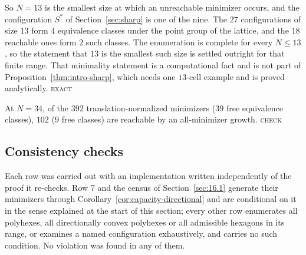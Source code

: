 \documentclass[11pt]{article}
\theoremstyle{plain}
\theoremstyle{definition}
\theoremstyle{remark}
\begin{document}
So \(N=13\) is the smallest size at which an unreachable minimizer occurs, and the
configuration \(S^{*}\) of Section~\ref{sec:sharp} is one of the nine. The \(27\)
configurations of size \(13\) form \(4\) equivalence classes under the point group of the
lattice, and the \(18\) reachable ones form \(2\) such classes. The enumeration is complete
for every \(N\le13\), so the statement that \(13\) is the smallest such size is settled
outright for that finite range. That minimality statement is a computational fact and is
not part of Proposition~\ref{thm:intro-sharp}, which needs one \(13\)-cell example and is
proved analytically. \textsc{exact}

At \(N=34\), of the \(392\) translation-normalized minimizers (\(39\) free equivalence
classes), \(102\) (\(9\) free classes) are reachable by an all-minimizer growth.
\textsc{check}

\subsection{Consistency checks}\label{sec:16.2}

Each row was carried out with an implementation written independently of the proof it
re-checks. Row 7 and the census of Section~\ref{sec:16.1} generate their minimizers
through Corollary~\ref{cor:capacity-directional} and are conditional on it in the sense explained at
the start of this section; every other row enumerates all polyhexes, all directionally
convex polyhexes or all admissible hexagons in its range, or examines a named
configuration exhaustively, and carries no such condition. No violation was found in any
of them.
\end{document}
